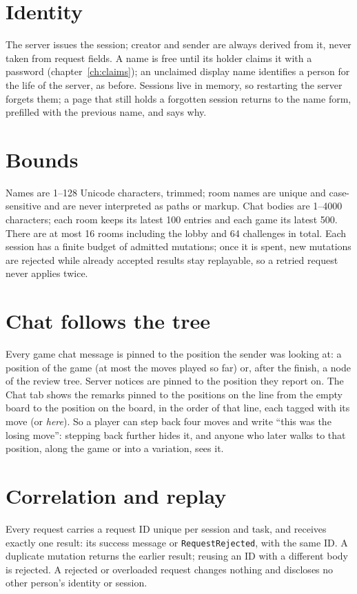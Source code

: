 \documentclass[11pt,oneside]{book}
\begin{document}
\section{Identity}
The server issues the session; creator and sender are always derived from it,
never taken from request fields. A name is free until its holder claims it with
a password (chapter~\ref{ch:claims}); an unclaimed display name identifies a
person for the life of the server, as before.
Sessions live in memory, so restarting the server forgets them; a page
that still holds a forgotten session returns to the name form, prefilled with
the previous name, and says why.

\section{Bounds}
Names are 1--128 Unicode characters, trimmed; room names are unique and
case-sensitive and are never interpreted as paths or markup. Chat bodies are
1--4000 characters; each room keeps its latest 100 entries and each game its
latest 500. There
are at most 16 rooms including the lobby and 64 challenges in total. Each
session has a finite budget of admitted mutations; once it is spent, new
mutations are rejected while already accepted results stay replayable, so a
retried request never applies twice.

\section{Chat follows the tree}
Every game chat message is pinned to the position the sender was looking at: a
position of the game (at most the moves played so far) or, after the finish, a
node of the review tree. Server notices are pinned to the position they report
on. The Chat tab shows the remarks pinned to the positions on the line from the
empty board to the position on the board, in the order of that line, each tagged
with its move (or \emph{here}). So a player can step back four moves and write
``this was the losing move'': stepping back further hides it, and anyone who
later walks to that position, along the game or into a variation, sees it.

\section{Correlation and replay}
Every request carries a request ID unique per session and task, and receives
exactly one result: its success message or \texttt{RequestRejected}, with the
same ID. A duplicate mutation returns the earlier result; reusing an ID with a
different body is rejected. A rejected or overloaded request changes nothing
and discloses no other person's identity or session.
\end{document}
